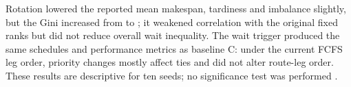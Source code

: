 \begin{table}[htbp]
\centering
\caption{C fairness variants: mean $\pm$ standard deviation over ten seeds.}
\label{tab:fairness-variants}

\end{table}

Rotation lowered the reported mean makespan, tardiness and imbalance slightly,
but the Gini increased from \GiniC{} to \GiniCRotate{}; it weakened correlation with the
original fixed ranks but did not reduce overall wait inequality. The wait
trigger produced the same schedules and performance metrics as baseline C:
under the current FCFS leg order, priority changes mostly affect ties and did
not alter route-leg order. These results are descriptive for ten seeds; no
significance test was performed \cite{projectRepo}.


